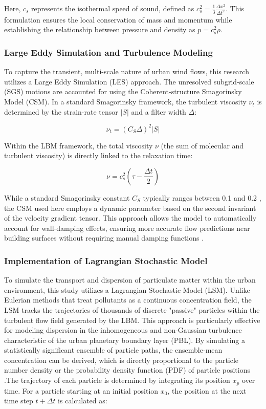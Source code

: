 Here, $c_s$ represents the isothermal speed of sound, defined as $c_s^2 = \frac{1}{3}\frac{\Delta x^2}{\Delta t^2}$. This formulation ensures the local conservation of mass and momentum while establishing the relationship between pressure and density as $p = c_s^2 \rho$.

\subsubsection{Large Eddy Simulation and Turbulence Modeling}
To capture the transient, multi-scale nature of urban wind flows, this research utilizes a Large Eddy Simulation (LES) approach. The unresolved subgrid-scale (SGS) motions are accounted for using the Coherent-structure Smagorinsky Model (CSM). In a standard Smagorinsky framework, the turbulent viscosity $\nu_t$ is determined by the strain-rate tensor $|S|$ and a filter width $\Delta$:

\begin{equation}
    \nu_t = (C_S\Delta)^2|S|    
\end{equation}

Within the LBM framework, the total viscosity $\nu$ (the sum of molecular and turbulent viscosity) is directly linked to the relaxation time:

\begin{equation}
    \nu = c_s^2 \left(\tau - \frac{\Delta t}{2} \right)    
\end{equation}

While a standard Smagorinsky constant $C_S$ typically ranges between 0.1 and 0.2 \parencite{Blazek2015CFD}, the CSM used here employs a dynamic parameter based on the second invariant of the velocity gradient tensor. This approach allows the model to automatically account for wall-damping effects, ensuring more accurate flow predictions near building surfaces without requiring manual damping functions \parencite{Phuc2018CSM}.

\subsubsection{Implementation of Lagrangian Stochastic Model}
To simulate the transport and dispersion of particulate matter within the urban environment, this study utilizes a Lagrangian Stochastic Model (LSM). Unlike Eulerian methods that treat pollutants as a continuous concentration field, the LSM tracks the trajectories of thousands of discrete "passive" particles within the turbulent flow field generated by the LBM. This approach is particularly effective for modeling dispersion in the inhomogeneous and non-Gaussian turbulence characteristic of the urban planetary boundary layer (PBL). By simulating a statistically significant ensemble of particle paths, the ensemble-mean concentration can be derived, which is directly proportional to the particle number density or the probability density function (PDF) of particle positions \parencite{Weil2024LSM}.The trajectory of each particle is determined by integrating its position $x_p$ over time. For a particle starting at an initial position $x_0$, the position at the next time step $t + \Delta t$ is calculated as:


